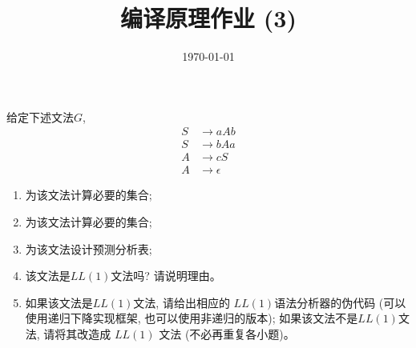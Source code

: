 \documentclass[a4paper, justified]{tufte-handout}
\title{编译原理作业 (3)}
\date{\today}
\begin{document}
\maketitle
\noplagiarism %
\begin{abstract}
\end{abstract}
\beginrequired

\begin{problem}[\score{10 = 2 + 2 + 2 + 1 + 3}]
  给定下述文法$G$,
  \begin{align}
    S &\to aAb \\[8pt]
    S &\to bAa \\[8pt]
    A &\to cS \\[8pt]
    A &\to \epsilon
  \end{align}

  \begin{enumerate}[(1)]
    \item 为该文法计算必要的\first{}集合;
    \item 为该文法计算必要的\follow{}集合;
    \item 为该文法设计预测分析表;
    \item 该文法是$LL(1)$文法吗? 请说明理由。
    \item 如果该文法是$LL(1)$文法, 请给出相应的 $LL(1)$语法分析器的伪代码
      (可以使用递归下降实现框架, 也可以使用非递归的版本);
      如果该文法不是$LL(1)$文法, 请将其改造成 $LL(1)$ 文法 (不必再重复各小题)。
  \end{enumerate}
\end{problem}
\end{document}
